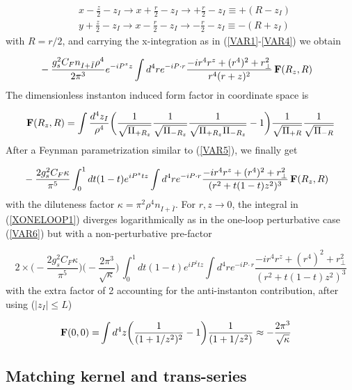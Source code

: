 \documentclass[11pt,aps,amsmath,amssymb,nofootinbib,notitlepage,longbibliography]{revtex4-1}
\newcommand{\be}{\begin{equation}}
\newcommand{\ee}{\end{equation}}
\begin{document}
\begin{align}
&x-\frac z2-z_I\rightarrow x+\frac r2 -z_I\rightarrow +\frac r2-z_I\equiv +( R-z_I)\nonumber\\
&y+\frac z2-z_I\rightarrow x-\frac r2 -z_I\rightarrow -\frac r2-z_I\equiv -( R+z_I)
\end{align}
with $ R=r/2$, and carrying the x-integration as in (\ref{VAR1}-\ref{VAR4}) we obtain


\begin{align}
&-\frac{g_s^2C_Fn_{I+\bar I}\rho^4}{2\pi^3}e^{-iP^zz}
\int d^4re^{-iP\cdot r}\frac{-ir^4r^z+(r^4)^2+r_\perp^2}{r^4(r+z)^2} \,{\bf F}(R_z, R)
\end{align}
The  dimensionless instanton induced  form factor  in coordinate space is

\be
{\bf F}(R_z, R)=
\int \frac{d^4z_I}{\rho^4}
\bigg(\frac 1{\sqrt{\Pi_{+R_z}}}\frac 1{\sqrt{\Pi_{-R_z}}}\frac 1{\sqrt{\Pi_{+R_z}\Pi_{-R_z}}}-1\bigg)\frac 1{\sqrt{\Pi_{+ R}}}\frac 1{\sqrt{\Pi_{-R}}}
\ee
After a Feynman parametrization similar to (\ref{VAR5}), we finally get

\begin{align}
\label{XONELOOP1}
&-\frac{2g_s^2C_F\kappa}{\pi^5}
\int_{0}^1 dt(1-t)e^{iP^ztz}\int d^4r e^{-iP\cdot r}\frac{-ir^4r^z+(r^4)^2+r_\perp^2}{(r^2+t(1-t)z^2)^3}\,{\bf F}(R_z, R)
\end{align}
with the diluteness factor $\kappa=\pi^2\rho^4n_{I+\bar I}$.  For $r,z\rightarrow 0$, the integral in (\ref{XONELOOP1}) diverges
logarithmically as in the one-loop perturbative case (\ref{VAR6}) but with a non-perturbative pre-factor

\be
2\times\bigg(-\frac{2g_s^2C_F\kappa}{\pi^5}\bigg)\bigg(-\frac{2\pi^3}{\sqrt\kappa}\bigg)\,\int_{0}^1 dt(1-t)e^{iP^ztz}\int d^4r e^{-iP\cdot r}\frac{-ir^4r^z+(r^4)^2+r_\perp^2}{(r^2+t(1-t)z^2)^3}
\ee
with the extra factor of  2 accounting for the anti-instanton contribution, after using ($|z_I|\leq L$)

\begin{align}
{\bf F}(0,0)=&\int d^4z \bigg(\frac 1{({1+1/z^2})^2}-1\bigg)\frac 1{({1+1/z^2})}\approx-\frac{2\pi^3}{\sqrt\kappa}
\end{align}


\subsection{Matching kernel and trans-series}
\end{document}
